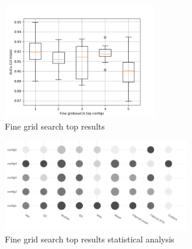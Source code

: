 \begin{figure}[ht]
\centering
\includegraphics[height= 5cm]{images/densenet/fine_grid_search_top_configs}
\caption{Fine grid search top results}
\label{fig:fine_grid_search_top_configs}
\end{figure}

\begin{figure}[ht]
\centering
\includegraphics[height= 4cm]{images/densenet/top5_analysis_bubble}
\caption{Fine grid search top results statistical analysis}
\label{fig:top5_analysis_bubble}
\end{figure}


